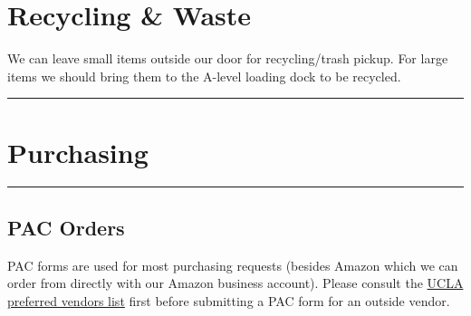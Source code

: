 \documentclass[]{book}
\begin{document}
\hypertarget{recycling-waste}{%
\section{Recycling \& Waste}\label{recycling-waste}}

We can leave small items outside our door for recycling/trash pickup. For large items we should bring them to the A-level loading dock to be recycled.

\begin{center}\rule{0.5\linewidth}{0.5pt}\end{center}

\hypertarget{purchasing}{%
\section{Purchasing}\label{purchasing}}

\begin{center}\rule{0.5\linewidth}{0.5pt}\end{center}

\hypertarget{pac-orders}{%
\subsection{PAC Orders}\label{pac-orders}}

PAC forms are used for most purchasing requests (besides Amazon which we can order from directly with our Amazon business account). Please consult the \href{http://staff.purchasing.ucla.edu/Portal/app/agreements/agreementsummary.aspx}{UCLA preferred vendors list} first before submitting a PAC form for an outside vendor.
\end{document}

